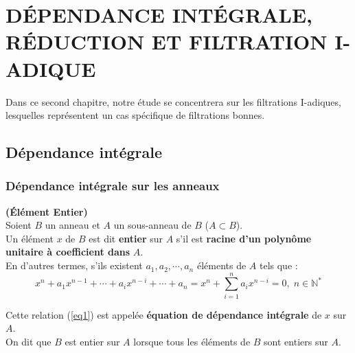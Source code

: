 \chapter{DÉPENDANCE INTÉGRALE, RÉDUCTION ET FILTRATION I-ADIQUE}

Dans ce second chapitre, notre étude se concentrera sur les filtrations I-adiques, lesquelles représentent un cas spécifique de filtrations bonnes.

\section{Dépendance intégrale}
\subsection{Dépendance intégrale sur les anneaux}
\begin{madefinition}\textbf{(Élément Entier)}\cite{Di2} \\
	Soient $B$ un anneau et $A$ un sous-anneau de $B$ ($A \subset B$).\\
	Un élément $x$ de $B$ est dit \textbf{entier} sur $A$ s'il est \textbf{racine d'un polynôme unitaire à coefficient dans} $A$.\\
	En d'autres termes, s'ils existent $a_1, a_2, \cdots , a_n$ éléments de $A$ tels que :\\
	\begin{equation}
		\label{eq1}
		x^n + a_1 x^{n-1} +\cdots+a_i x^{n-i} +\cdots + a_n = x^n + \sum_{i=1}^{n} a_i x^{n-i} = 0, \; n \in \mathbb{N^*}
	\end{equation}
	
	Cette relation (\ref{eq1}) est appelée \textbf{équation de dépendance intégrale} de $x$ sur $A$.\\
	On dit que $B$ est entier sur $A$ lorsque tous les éléments de $B$ sont entiers sur $A$.
\end{madefinition}

